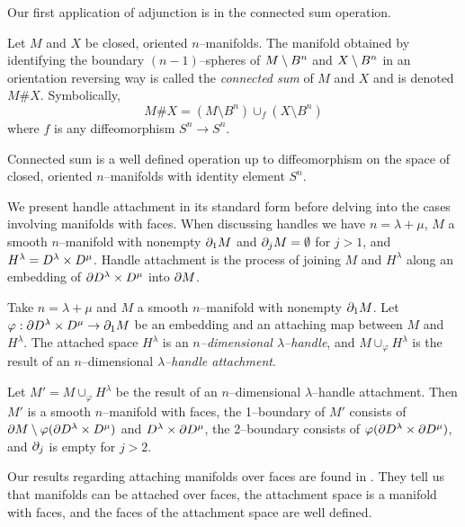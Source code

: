 Our first application of adjunction is in the connected sum operation.

\begin{defn}
	Let $M$ and $X$ be closed, oriented $n$--manifolds.
	The manifold obtained by identifying the boundary $(n-1)$--spheres of $M\setminus B^n$ and $X\setminus B^n$ in an orientation reversing way is called the \emph{connected sum} of $M$ and $X$ and is denoted $M\# X$.
	Symbolically,
	\[
		M\# X = (M\setminus B^n)\cup_f (X\setminus B^n)
	\]
	where $f$ is any diffeomorphism $S^n\to S^n$.
\end{defn}

\begin{prop}
	Connected sum is a well defined operation up to diffeomorphism on the space of closed, oriented $n$--manifolds with identity element $S^n$.
\end{prop}

We present handle attachment in its standard form before delving into the cases involving manifolds with faces.
When discussing handles we have $n=\lambda+\mu$, $M$ a smooth $n$--manifold with nonempty $\partial_1 M$ and $\partial_j M=\emptyset$ for $j>1$, and $H^\lambda = D^\lambda\times D^\mu$.
Handle attachment is the process of joining $M$ and $H^\lambda$ along an embedding of $\partial D^\lambda\times D^\mu$ into $\partial M$.

\begin{defn}[Handle]
	\label{def:handle}
	Take $n=\lambda+\mu$ and $M$ a smooth $n$--manifold with nonempty $\partial_1 M$.
	Let $\varphi:\partial D^\lambda\times D^\mu\to\partial_1 M$ be an embedding and an attaching map between $M$ and $H^\lambda$.
	The attached space $H^\lambda$ is an \emph{$n$--dimensional $\lambda$--handle}, and $M\cup_\varphi H^\lambda$ is the result of an $n$--dimensional \emph{$\lambda$--handle attachment}.
\end{defn}

\begin{prop}
	\label{prop:handle}
	Let $M'=M\cup_\varphi H^\lambda$ be the result of an $n$--dimensional $\lambda$--handle attachment.
	Then $M'$ is a smooth $n$--manifold with faces, the 1--boundary of $M'$ consists of $\partial M\setminus\varphi(\partial D^\lambda\times D^\mu)$ and $D^\lambda\times\partial D^\mu$, the 2--boundary consists of $\varphi(\partial D^\lambda\times\partial D^\mu)$, and $\partial_j$ is empty for $j>2$.
\end{prop}

Our results regarding attaching manifolds over faces are found in \cite{JSP}.
They tell us that manifolds can be attached over faces, the attachment space is a manifold with faces, and the faces of the attachment space are well defined.

